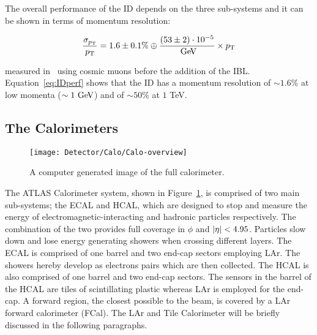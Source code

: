 				The overall performance of the \ac{ID} depends on the three sub-systems and it can be shown in terms of momentum resolution: 

				\begin{equation}
				\label{eq:IDperf}
					\displaystyle \frac{\sigma_{\pt}}{\pt} = 1.6 \pm 0.1\% \oplus \frac{(53 \pm 2) \cdot 10^{-5}}{\GeV} \times \pt
				\end{equation}

				\noindent measured in~\cite{Aad2011} using cosmic muons before the addition of the \ac{IBL}. Equation~\ref{eq:IDperf} shows that the \ac{ID} has a momentum resolution of $\sim 1.6\%$ at low momenta ($\sim 1 \GeV$) and of $\sim 50\%$ at $1$ TeV.

		\subsection{The Calorimeters}

			\begin{figure}[!htb]
				\centering
				\texttt{[image: Detector/Calo/Calo-overview]}
				\caption{A computer generated image of the full calorimeter.}
				\label{fig:Calo}
			\end{figure}

			The \ac{ATLAS} Calorimeter system, shown in Figure~\ref{fig:Calo}, is comprised of two main sub-systems; the \ac{ECAL} and \ac{HCAL}, which are designed to stop and measure the energy of electromagnetic-interacting and hadronic particles respectively. The combination of the two provides full coverage in $\phi$ and $|\eta| < 4.95$. Particles slow down and lose energy generating showers when crossing different layers. The \ac{ECAL} is comprised of one barrel and two end-cap sectors employing \ac{LAr}. The showers hereby develop as electrons pairs which are then collected. The \ac{HCAL} is also comprised of one barrel and two end-cap sectors. The sensors in the barrel of the \ac{HCAL} are tiles of scintillating plastic whereas \ac{LAr} is employed for the end-cap. A forward region, the closest possible to the beam, is covered by a \ac{LAr} forward calorimeter (FCal). The \ac{LAr} and Tile Calorimeter will be briefly discussed in the following paragraphs. 

